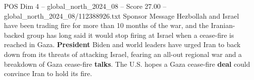 \begin{textsample}{POS Dim 4 – global\_north\_2024\_08 – Score 27.00 – global\_north\_2024\_08/112388926.txt}
Sponsor Message Hezbollah and Israel have been trading fire for more than 10 months of the war, and the Iranian-backed group has long said it would stop firing at Israel when a cease-fire is reached in Gaza. \textbf{President} Biden and world leaders have urged Iran to back down from its threats of attacking Israel, fearing an all-out regional war and a breakdown of Gaza cease-fire \textbf{talks}.
The U.S. hopes a Gaza cease-fire \textbf{deal} could convince Iran to hold its fire.

\end{textsample}
